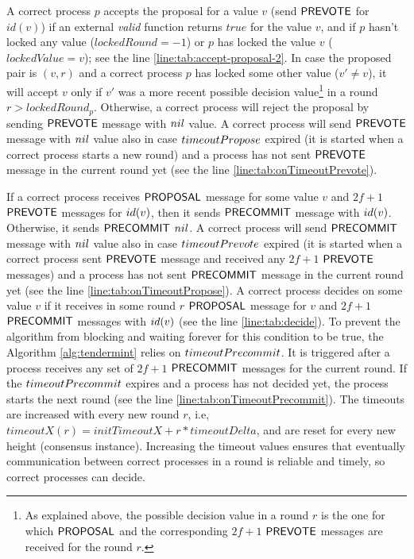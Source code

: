 A correct process $p$ accepts the proposal for a value $v$  (send $\mathsf{PREVOTE}$
for $id(v)$) if an external \emph{valid} function returns $true$ for the value
$v$, and if $p$ hasn't locked any value ($lockedRound = -1$) or $p$ has locked
the value $v$ ($lockedValue = v$); see the line
\ref{line:tab:accept-proposal-2}.  In case the proposed pair is $(v,r)$ and a
correct process $p$ has locked some other value ($v' \neq v$), it will accept
$v$ only if $v'$ was a more recent possible decision value\footnote{As
explained above, the possible decision value in a round $r$ is the one for
which $\mathsf{PROPOSAL}$ and the corresponding $2f+1$ $\mathsf{PREVOTE}$ messages are received
for the round $r$.} in a round $r > lockedRound_p$.  Otherwise, a correct
process will reject the proposal by sending $\mathsf{PREVOTE}$ message with $nil$
value. A correct process will send $\mathsf{PREVOTE}$ message with $nil$ value also in
case $timeoutPropose$ expired (it is started when a correct process starts a
new round) and a process has not sent $\mathsf{PREVOTE}$ message in the current round
yet (see the line \ref{line:tab:onTimeoutPrevote}). 

If a correct process receives $\mathsf{PROPOSAL}$ message for some value $v$ and $2f+1$
$\mathsf{PREVOTE}$ messages for $id(v)$, then it sends $\mathsf{PRECOMMIT}$ message with
$id(v)$. Otherwise, it sends $\mathsf{PRECOMMIT}$ $nil$. A correct process will send
$\mathsf{PRECOMMIT}$ message with $nil$ value also in case $timeoutPrevote$ expired
(it is started when a correct process sent $\mathsf{PREVOTE}$ message and received any
$2f+1$ $\mathsf{PREVOTE}$ messages)  and a process has not sent $\mathsf{PRECOMMIT}$ message in
the current round yet (see the line \ref{line:tab:onTimeoutPropose}).  A
correct process decides on some value $v$ if it receives in some round $r$
$\mathsf{PROPOSAL}$ message for $v$ and $2f+1$ $\mathsf{PRECOMMIT}$ messages with $id(v)$ (see
the line \ref{line:tab:decide}).  To prevent the algorithm from blocking and
waiting forever for this condition to be true, the Algorithm
\ref{alg:tendermint} relies on $timeoutPrecommit$. It is triggered after a
process receives any set of $2f+1$ $\mathsf{PRECOMMIT}$ messages for the current round.
If the $timeoutPrecommit$ expires and a process has not decided yet, the
process starts the next round (see the line \ref{line:tab:onTimeoutPrecommit}).
The timeouts are increased with every new round $r$, i.e, $timeoutX(r) =
initTimeoutX + r*timeoutDelta$, and are reset for every new height (consensus
instance). Increasing the timeout values ensures that eventually communication
between correct processes in a round is reliable and timely, so correct
processes can decide. 

